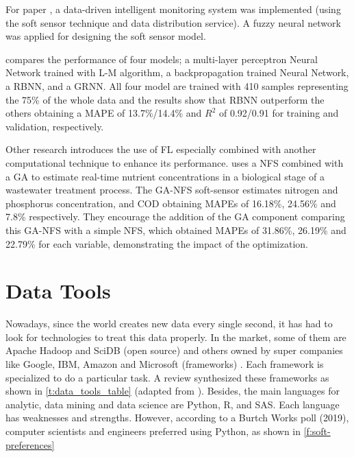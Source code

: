 For paper \cite{Han2018}, a data-driven intelligent monitoring system was implemented (using the soft sensor technique and data distribution service). A fuzzy neural network was applied for designing the soft sensor model.

\cite{Shen2018} compares the performance of four models; a multi-layer perceptron Neural Network trained with \ac{L-M} algorithm, a backpropagation trained Neural Network, a \ac{RBNN}, and a \ac{GRNN}. All four model are trained with 410 samples representing the 75\% of the whole data and the results show that \ac{RBNN} outperform the others obtaining a \ac{MAPE} of 13.7\%/14.4\% and \begin{math}R^2\end{math} of 0.92/0.91 for training and validation, respectively.

Other research introduces the use of \ac{FL} especially combined with another computational technique to enhance its performance. \cite{Huang2015} uses a \ac{NFS} combined with a \ac{GA} to estimate real-time nutrient concentrations in a biological stage of a wastewater treatment process. The GA-NFS soft-sensor estimates nitrogen and phosphorus concentration, and \ac{COD} obtaining \ac{MAPE}s of 16.18\%, 24.56\% and 7.8\% respectively. They encourage the addition of the GA component comparing this \ac{GA}-\ac{NFS} with a simple \ac{NFS}, which obtained \ac{MAPE}s of 31.86\%, 26.19\% and 22.79\% for each variable, demonstrating the impact of the optimization.

\section{Data Tools}
\label{s:Related-Works-Data-Tools}

Nowadays, since the world creates new data every single second, it has had to look for technologies to treat this data properly. In the market, some of them are Apache Hadoop and SciDB (open source) and others owned by super companies like Google, IBM, Amazon and Microsoft (frameworks) \cite{Siddiqui2015}. Each framework is specialized to do a particular task. A review \cite{Valentin-Vargas2012} synthesized these frameworks as shown in \autoref{t:data_tools_table} (adapted from \cite{Valentin-Vargas2012}). Besides, the main languages for analytic, data mining and data science are Python, R, and SAS. Each language has weaknesses and strengths. However, according to a Burtch Works poll (2019), computer scientists and engineers preferred using Python, as shown in \autoref{f:soft-preferences}

